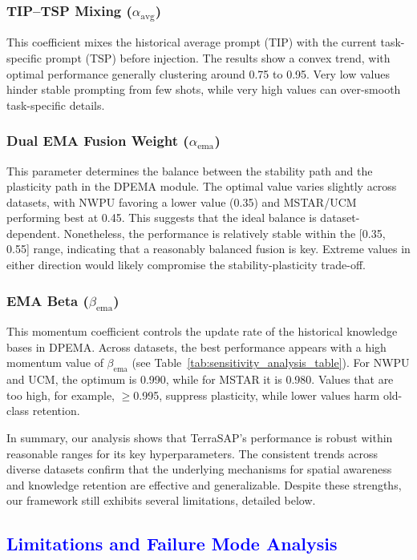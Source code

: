 ﻿\documentclass[letterpaper,journal]{IEEEtran}
\begin{document}
\subsubsection{\textbf{TIP--TSP Mixing ($\alpha_{\mathrm{avg}}$)}} This coefficient mixes the historical average prompt (TIP) with the current task-specific prompt (TSP) before injection. The results show a convex trend, with optimal performance generally clustering around 0.75 to 0.95. Very low values hinder stable prompting from few shots, while very high values can over-smooth task-specific details.

\subsubsection{\textbf{Dual EMA Fusion Weight ($\alpha_{\mathrm{ema}}$)}} This parameter determines the balance between the stability path and the plasticity path in the DPEMA module. The optimal value varies slightly across datasets, with NWPU favoring a lower value (0.35) and MSTAR/UCM performing best at 0.45. This suggests that the ideal balance is dataset-dependent. Nonetheless, the performance is relatively stable within the [0.35, 0.55] range, indicating that a reasonably balanced fusion is key. Extreme values in either direction would likely compromise the stability-plasticity trade-off.

\subsubsection{\textbf{EMA Beta ($\beta_{\text{ema}}$)}} This momentum coefficient controls the update rate of the historical knowledge bases in DPEMA. Across datasets, the best performance appears with a high momentum value of $\beta_{\text{ema}}$ (see Table~\ref{tab:sensitivity_analysis_table}). For NWPU and UCM, the optimum is 0.990, while for MSTAR it is 0.980. Values that are too high, for example, $\geq$0.995, suppress plasticity, while lower values harm old-class retention.

In summary, our analysis shows that TerraSAP's performance is robust within reasonable ranges for its key hyperparameters. The consistent trends across diverse datasets confirm that the underlying mechanisms for spatial awareness and knowledge retention are effective and generalizable. Despite these strengths, our framework still exhibits several limitations, detailed below.

\subsection{\textcolor{blue}{Limitations and Failure Mode Analysis}}
\end{document}
